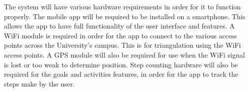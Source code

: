 The system will have various hardware requirements in order for it to function properly. The mobile app will be required to be installed on a smartphone. This allows the app to have full functionality of the user interface and features.
\bigskip
\noindent
A WiFi module is required in order for the app to connect to the various access points across the University's campus. This is for triangulation using the WiFi access points. A GPS module will also be required for use when the WiFi signal is lost or too weak to determine position. Step counting hardware will also be required for the goals and activities features, in order for the app to track the steps make by the user.